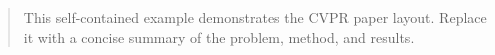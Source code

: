 \begin{abstract}
This self-contained example demonstrates the CVPR paper layout. Replace it with a concise summary of the problem, method, and results.
\end{abstract}
